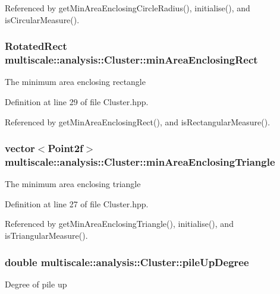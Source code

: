 Referenced by get\-Min\-Area\-Enclosing\-Circle\-Radius(), initialise(), and is\-Circular\-Measure().

\hypertarget{classmultiscale_1_1analysis_1_1Cluster_aeb032303a79c6bd43385fcaad9c50742}{
\subsubsection[{min\-Area\-Enclosing\-Rect}]{\setlength{\rightskip}{0pt plus 5cm}Rotated\-Rect multiscale\-::analysis\-::\-Cluster\-::min\-Area\-Enclosing\-Rect\hspace{0.3cm}{\ttfamily [private]}}}\label{classmultiscale_1_1analysis_1_1Cluster_aeb032303a79c6bd43385fcaad9c50742}
The minimum area enclosing rectangle 

Definition at line 29 of file Cluster.\-hpp.



Referenced by get\-Min\-Area\-Enclosing\-Rect(), and is\-Rectangular\-Measure().

\hypertarget{classmultiscale_1_1analysis_1_1Cluster_a7678d48581202c3ecc3f1283a1730dfa}{
\subsubsection[{min\-Area\-Enclosing\-Triangle}]{\setlength{\rightskip}{0pt plus 5cm}vector$<$Point2f$>$ multiscale\-::analysis\-::\-Cluster\-::min\-Area\-Enclosing\-Triangle\hspace{0.3cm}{\ttfamily [private]}}}\label{classmultiscale_1_1analysis_1_1Cluster_a7678d48581202c3ecc3f1283a1730dfa}
The minimum area enclosing triangle 

Definition at line 27 of file Cluster.\-hpp.



Referenced by get\-Min\-Area\-Enclosing\-Triangle(), initialise(), and is\-Triangular\-Measure().

\hypertarget{classmultiscale_1_1analysis_1_1Cluster_ab7e6a3501bc6e94c19b448f502d6ecec}{
\subsubsection[{pile\-Up\-Degree}]{\setlength{\rightskip}{0pt plus 5cm}double multiscale\-::analysis\-::\-Cluster\-::pile\-Up\-Degree\hspace{0.3cm}{\ttfamily [private]}}}\label{classmultiscale_1_1analysis_1_1Cluster_ab7e6a3501bc6e94c19b448f502d6ecec}
Degree of pile up 

